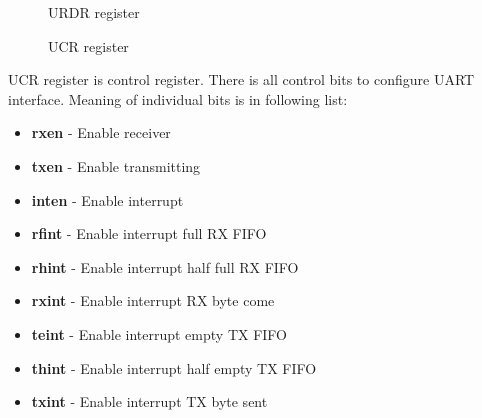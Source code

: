 \begin{figure}[H]
    \centering
    \caption{URDR register}
    \label{fig:URDR_reg}
\end{figure}

\begin{figure}[H]
    \centering
    \caption{UCR register}
    \label{fig:UCR_reg}
\end{figure}

UCR register is control register. There is all control bits to configure UART interface.
Meaning of individual bits is in following list:

\begin{itemize}
    \item \textbf{rxen} - Enable receiver
    \item \textbf{txen} - Enable transmitting
    \item \textbf{inten} - Enable interrupt
    \item \textbf{rfint} - Enable interrupt full RX FIFO
    \item \textbf{rhint} - Enable interrupt half full RX FIFO
    \item \textbf{rxint} - Enable interrupt RX byte come
    \item \textbf{teint} - Enable interrupt empty TX FIFO
    \item \textbf{thint} - Enable interrupt half empty TX FIFO
    \item \textbf{txint} - Enable interrupt TX byte sent
\end{itemize}

